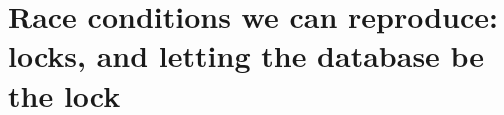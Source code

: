 \chapter{Race conditions we can reproduce: locks, and letting the database be the lock}
\label{ch:race-conditions-we-can-reproduce-locks}

